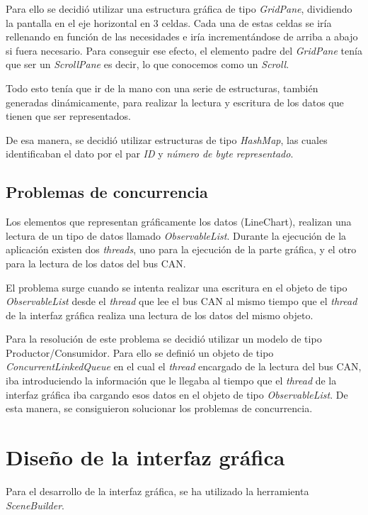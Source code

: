Para ello se decidió utilizar una estructura gráfica de tipo \emph{GridPane}, dividiendo la pantalla en el eje horizontal en 3 celdas. Cada una de estas celdas se iría rellenando en función de las necesidades e iría incrementándose de arriba a abajo si fuera necesario. Para conseguir ese efecto, el elemento padre del \emph{GridPane} tenía que ser un \emph{ScrollPane} es decir, lo que conocemos como un \emph{Scroll}.

Todo esto tenía que ir de la mano con una serie de estructuras, también generadas dinámicamente, para realizar la lectura y escritura de los datos que tienen que ser representados.

De esa manera, se decidió utilizar estructuras de tipo \emph{HashMap}, las cuales identificaban el dato por el par \emph{ID} y \emph{número de byte representado}.

\subsection{Problemas de concurrencia}\label{problemas_de_concurrencia}

Los elementos que representan gráficamente los datos (LineChart), realizan una lectura de un tipo de datos llamado \emph{ObservableList}. Durante la ejecución de la aplicación existen dos \emph{threads}, uno para la ejecución de la parte gráfica, y el otro para la lectura de los datos del bus CAN.

El problema surge cuando se intenta realizar una escritura en el objeto de tipo \emph{ObservableList} desde el \emph{thread} que lee el bus CAN al mismo tiempo que el \emph{thread} de la interfaz gráfica realiza una lectura de los datos del mismo objeto.

Para la resolución de este problema se decidió utilizar un modelo de tipo Productor/Consumidor. Para ello se definió un objeto de tipo \emph{ConcurrentLinkedQueue} en el cual el \emph{thread} encargado de la lectura del bus CAN, iba introduciendo la información que le llegaba al tiempo que el \emph{thread} de la interfaz gráfica iba cargando esos datos en el objeto de tipo \emph{ObservableList}. De esta manera, se consiguieron solucionar los problemas de concurrencia.

\section{Diseño de la interfaz gráfica}\label{diseño_de_la_interfaz_grafica}

Para el desarrollo de la interfaz gráfica, se ha utilizado la herramienta \emph{SceneBuilder}.

